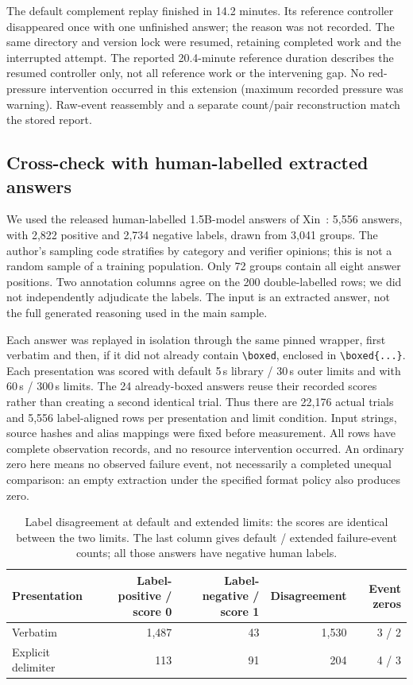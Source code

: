 \documentclass[10pt,a4paper]{article}
\let\cite\citep
\begin{document}
The default complement replay finished in 14.2 minutes. Its reference
controller disappeared once with one unfinished answer; the reason was
not recorded. The same directory and version lock were resumed, retaining
completed work and the interrupted attempt. The reported 20.4-minute
reference duration describes the resumed controller only, not all reference
work or the intervening gap. No red-pressure intervention occurred in this
extension (maximum recorded pressure was warning). Raw-event reassembly
and a separate count/pair reconstruction match the stored report.

\subsection{Cross-check with human-labelled extracted answers}
\label{sec:labels}

We used the released human-labelled 1.5B-model answers of
Xin~\cite{xin2026groupcorr,humanlabels}: 5,556 answers, with 2,822 positive
and 2,734 negative labels, drawn from 3,041 groups. The author's sampling
code stratifies by category and verifier opinions; this is not a random
sample of a training population. Only 72 groups contain all eight answer
positions. Two annotation columns agree on the 200 double-labelled rows;
we did not independently adjudicate the labels. The input is an extracted
answer, not the full generated reasoning used in the main sample.

Each answer was replayed in isolation through the same pinned wrapper,
first verbatim and then, if it did not already contain \verb|\boxed|,
enclosed in \verb|\boxed{...}|. Each presentation was scored with default
5\,s library / 30\,s outer limits and with 60\,s / 300\,s limits. The 24
already-boxed answers reuse their recorded scores rather than creating a
second identical trial. Thus there are 22,176 actual trials and 5,556
label-aligned rows per presentation and limit condition. Input strings,
source hashes and alias mappings were fixed before measurement. All rows
have complete observation records, and no resource intervention occurred.
An ordinary zero here means no observed failure event, not necessarily a
completed unequal comparison: an empty extraction under the specified
format policy also produces zero.

\begin{table}[h]
\centering\small
\begin{tabular}{@{}lrrrr@{}}
\toprule
Presentation & Label-positive / score 0 & Label-negative / score 1 & Disagreement & Event zeros \\
\midrule
Verbatim & 1,487 & 43 & 1,530 & 3 / 2 \\
Explicit delimiter & 113 & 91 & 204 & 4 / 3 \\
\bottomrule
\end{tabular}
\caption{Label disagreement at default and extended limits: the scores are
identical between the two limits. The last column gives default / extended
failure-event counts; all those answers have negative human labels.}
\label{tab:labels}
\end{table}
\end{document}
